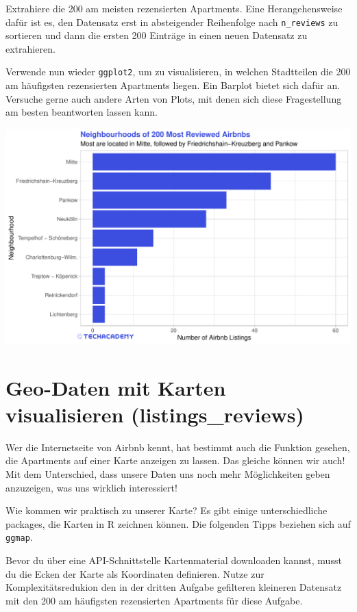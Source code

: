 \documentclass[
]{book}
\begin{document}
Extrahiere die 200 am meisten rezensierten Apartments.
Eine Herangehensweise dafür ist es, den Datensatz erst in absteigender Reihenfolge nach \texttt{n\_reviews} zu sortieren und dann die ersten 200 Einträge in einen neuen Datensatz zu extrahieren.

Verwende nun wieder \texttt{ggplot2}, um zu visualisieren, in welchen Stadtteilen die 200 am häufigsten rezensierten Apartments liegen.
Ein Barplot bietet sich dafür an.
Versuche gerne auch andere Arten von Plots, mit denen sich diese Fragestellung am besten beantworten lassen kann.

\includegraphics[width=1\linewidth]{plots/3_3_Barplot_MostReviewed}

\hypertarget{geo-daten-mit-karten-visualisieren-listings_reviews}{%
\section{Geo-Daten mit Karten visualisieren (listings\_reviews)}\label{geo-daten-mit-karten-visualisieren-listings_reviews}}

Wer die Internetseite von Airbnb kennt, hat bestimmt auch die Funktion gesehen, die Apartments auf einer Karte anzeigen zu lassen.
Das gleiche können wir auch!
Mit dem Unterschied, dass unsere Daten uns noch mehr Möglichkeiten geben anzuzeigen, was uns wirklich interessiert!

Wie kommen wir praktisch zu unserer Karte?
Es gibt einige unterschiedliche packages, die Karten in R zeichnen können.
Die folgenden Tipps beziehen sich auf \texttt{ggmap}.

Bevor du über eine API-Schnittstelle Kartenmaterial downloaden kannst, musst du die Ecken der Karte als Koordinaten definieren.
Nutze zur Komplexitätsredukion den in der dritten Aufgabe gefilteren kleineren Datensatz mit den 200 am häufigsten rezensierten Apartments für diese Aufgabe.
\end{document}
